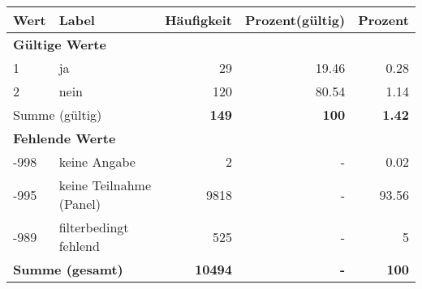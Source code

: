      \begin{longtable}{lXrrr}
     \toprule
     \textbf{Wert} & \textbf{Label} & \textbf{Häufigkeit} & \textbf{Prozent(gültig)} & \textbf{Prozent} \\
     \endhead
     \midrule
     \multicolumn{5}{l}{\textbf{Gültige Werte}}\\

     1 &
     \multicolumn{1}{X}{ ja   } &


       \num{29} &
       \num[round-mode=places,round-precision=2]{19,46} &
         \num[round-mode=places,round-precision=2]{0,28} \\

     2 &
     \multicolumn{1}{X}{ nein   } &


       \num{120} &
       \num[round-mode=places,round-precision=2]{80,54} &
         \num[round-mode=places,round-precision=2]{1,14} \\
     \midrule
     \multicolumn{2}{l}{Summe (gültig)} &
       \textbf{\num{149}} &
     \textbf{100} &
       \textbf{\num[round-mode=places,round-precision=2]{1,42}} \\
     \multicolumn{5}{l}{\textbf{Fehlende Werte}}\\
       -998 &
       keine Angabe &
         \num{2} &
        - &
         \num[round-mode=places,round-precision=2]{0,02} \\
       -995 &
       keine Teilnahme (Panel) &
         \num{9818} &
        - &
         \num[round-mode=places,round-precision=2]{93,56} \\
       -989 &
       filterbedingt fehlend &
         \num{525} &
        - &
         \num[round-mode=places,round-precision=2]{5} \\
     \midrule
     \multicolumn{2}{l}{\textbf{Summe (gesamt)}} &
          \textbf{\num{10494}} &
        \textbf{-} &
        \textbf{100} \\
     \bottomrule
     \end{longtable}
     
